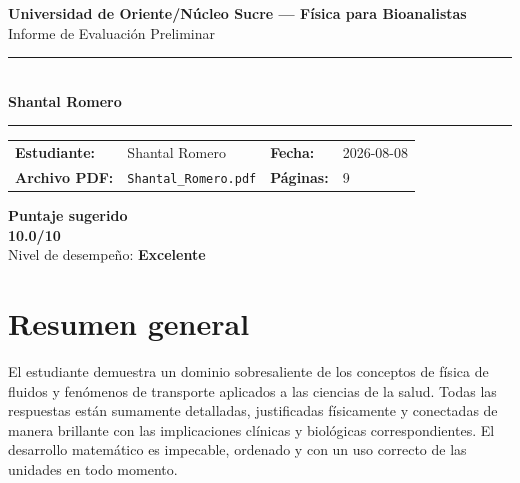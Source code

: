 \documentclass[11pt,a4paper]{article}
\begin{document}
\begin{center}
  {\Large\bfseries\color{azulTitulo} Universidad de Oriente/Núcleo Sucre --- Física para Bioanalistas}\\[4pt]
  {\large Informe de Evaluación Preliminar}\\[12pt]
  \rule{\linewidth}{1.2pt}\\[6pt]
  {\LARGE\bfseries Shantal Romero}\\[4pt]
  \rule{\linewidth}{0.6pt}
\end{center}

\vspace{4pt}
\begin{tcolorbox}[cajaTitulo, title=Datos del informe]
\begin{tabular}{@{}llll@{}}
  \textbf{Estudiante:}  & Shantal Romero  &
  \textbf{Fecha:}       & 2026-08-08 \\[4pt]
  \textbf{Archivo PDF:} & \texttt{Shantal\_Romero.pdf}  &
  \textbf{Páginas:}     & 9 \\
\end{tabular}
\end{tcolorbox}

\vspace{6pt}
\begin{center}
  \begin{tcolorbox}[
    enhanced,
    colback=white, colframe=desempeno_excelente,
    width=0.62\linewidth,
    boxrule=2pt,
    halign=center, valign=center,
    top=8pt, bottom=8pt,
  ]
    \centering
    {\large\bfseries Puntaje sugerido}\\[6pt]
    {\Huge\bfseries\color{desempeno_excelente} 10.0/10}\\[6pt]
    {\large Nivel de desempeño: \textbf{\color{desempeno_excelente} Excelente}}
  \end{tcolorbox}
\end{center}

\section*{Resumen general}
El estudiante demuestra un dominio sobresaliente de los conceptos de física de fluidos y fenómenos de transporte aplicados a las ciencias de la salud. Todas las respuestas están sumamente detalladas, justificadas físicamente y conectadas de manera brillante con las implicaciones clínicas y biológicas correspondientes. El desarrollo matemático es impecable, ordenado y con un uso correcto de las unidades en todo momento.
\end{document}
